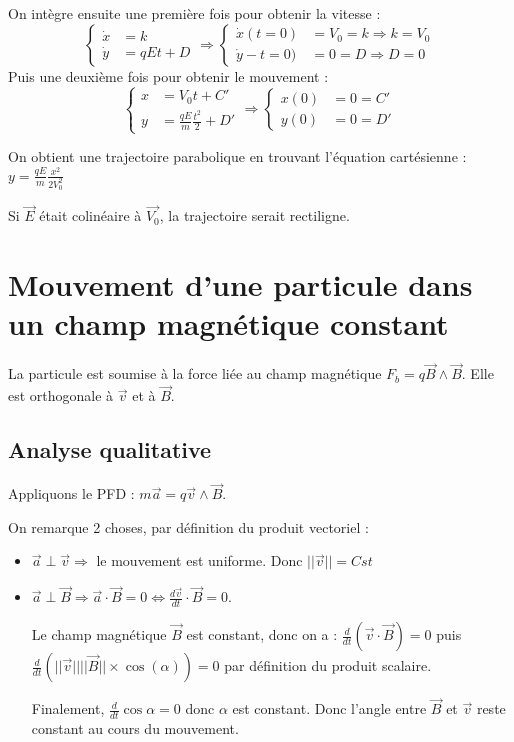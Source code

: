 \documentclass[french]{yLectureNote}
\renewcommand{\vec}{\overrightarrow}
\newcommand{\norm}[1]{||\vec{#1}||}
\begin{document}
On intègre ensuite une première fois pour obtenir la vitesse :
\[
 \left\{\begin{matrix}
 \dot{x} &= k \\
 \dot{y} &=qEt + D
\end{matrix}\right.
\Rightarrow
 \left\{\begin{matrix}
 \dot{x}(t=0) &= V_0 = k \Rightarrow k = V_0 \\
 \dot{y}-t=0) &=0 = D \Rightarrow D = 0
\end{matrix}\right.
\]
Puis une deuxième fois pour obtenir le mouvement :
\[
 \left\{\begin{matrix}
 x &= V_0t + C' \\
 y &= \frac{qE}{m}\frac{t^2}{2} + D'
\end{matrix}\right.
\Rightarrow
\left\{\begin{matrix}
 x(0) &=0 = C' \\
 y(0) &= 0 = D'
\end{matrix}\right.
\]

On obtient une trajectoire parabolique en trouvant l'équation cartésienne : $y = \frac{qE}{m}\frac{x^2}{2V_0^2}$

Si $\vec{E}$ était colinéaire à $ \vec{V_0}$, la trajectoire serait rectiligne.
\section{Mouvement d'une particule dans un champ magnétique constant}


La particule est soumise à la force liée au champ magnétique $F_b = q\vec{B} \wedge \vec{B}$. Elle est orthogonale à $\vec{v}$ et à $\vec{B}$.
\subsection{Analyse qualitative}
Appliquons le PFD : $m\vec{a} = q\vec{v}\wedge \vec{B}$.

On remarque 2 choses, par définition du produit vectoriel :
\begin{itemize}
 \item $\vec{a} \perp \vec{v} \Rightarrow$ le mouvement est uniforme. Donc $\norm{v} = Cst$
 \item $\vec{a}\perp\vec{B} \Rightarrow \vec{a}\cdot \vec{B} = 0 \iff \frac{d \vec{v}}{dt}\cdot \vec{B} = 0$.

 Le champ magnétique $\vec{B}$ est constant, donc on a : $\frac{d}{dt} (\vec{v}\cdot\vec{B}) = 0$ puis $\frac{d}{dt}(\norm{v}\norm{B}\times\cos(\alpha))  =0$ par définition du produit scalaire.

 Finalement, $\frac{d}{dt}\cos\alpha = 0$\marginInfo{Car $\norm{v}$ et $\norm{B}$ sont constants.} donc $\alpha $ est constant. Donc l'angle entre $\vec{B}$ et $\vec{v}$ reste constant au cours du mouvement.
\end{itemize}
\end{document}
